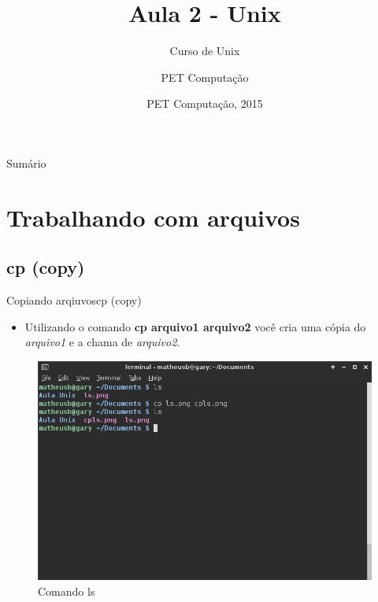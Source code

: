 \documentclass{beamer}
\title{Aula 2 - Unix}
\subtitle{Curso de Unix}
\author{PET Computa\c{c}ão}
\institute[UFSC] %
{
%
  Departamento de Informática e Estatística\\
  Universidade de Santa Catarina}
\date{PET Computa\c{c}ão, 2015}
\begin{document}
\begin{frame}
  \titlepage
\end{frame}

\begin{frame}{Sumário}
  \tableofcontents
\end{frame}

\section{Trabalhando com arquivos}

\subsection{cp (copy)}

\begin{frame}{Copiando arqiuvos}{cp (copy)}
  \begin{itemize}
  \item {
    Utilizando o comando \textbf{cp arquivo1 arquivo2} você cria uma cópia do \textit{arquivo1} e a chama de \textit{arquivo2}.
  }
  \end{itemize}
    \begin{figure}[h!]
        \centering
        \includegraphics[scale=0.30]{cp.png}
        \caption{Comando ls}
        \label{fig:Comando ls}
    \end{figure}
\end{frame}
\end{document}
